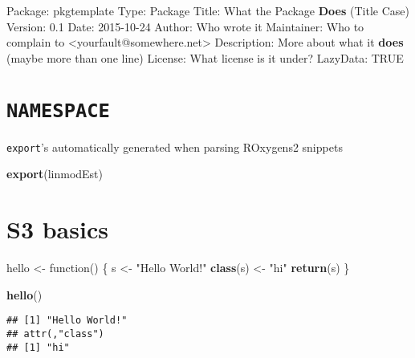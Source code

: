 \documentclass[]{book}
\newenvironment{Shaded}{\begin{snugshade}}{\end{snugshade}}
\newcommand{\KeywordTok}[1]{\textcolor[rgb]{0.13,0.29,0.53}{\textbf{{#1}}}}
\newcommand{\DecValTok}[1]{\textcolor[rgb]{0.00,0.00,0.81}{{#1}}}
\newcommand{\FloatTok}[1]{\textcolor[rgb]{0.00,0.00,0.81}{{#1}}}
\newcommand{\StringTok}[1]{\textcolor[rgb]{0.31,0.60,0.02}{{#1}}}
\newcommand{\OtherTok}[1]{\textcolor[rgb]{0.56,0.35,0.01}{{#1}}}
\newcommand{\NormalTok}[1]{{#1}}
\theoremstyle{definition}
\theoremstyle{definition}
\theoremstyle{definition}
\theoremstyle{remark}
\begin{document}
\begin{Shaded}
\begin{Highlighting}[]
\NormalTok{Package:}\StringTok{ }\NormalTok{pkgtemplate}
\NormalTok{Type:}\StringTok{ }\NormalTok{Package}
\NormalTok{Title:}\StringTok{ }\NormalTok{What the Package }\KeywordTok{Does} \NormalTok{(Title Case)}
\NormalTok{Version:}\StringTok{ }\FloatTok{0.1}
\NormalTok{Date:}\StringTok{ }\DecValTok{2015-10-24}
\NormalTok{Author:}\StringTok{ }\NormalTok{Who wrote it}
\NormalTok{Maintainer:}\StringTok{ }\NormalTok{Who to complain to <yourfault@somewhere.net>}
\NormalTok{Description:}\StringTok{ }\NormalTok{More about what it }\KeywordTok{does} \NormalTok{(maybe more than one line)}
\NormalTok{License:}\StringTok{ }\NormalTok{What license is it under?}
\NormalTok{LazyData:}\StringTok{ }\OtherTok{TRUE}
\end{Highlighting}
\end{Shaded}

\section{\texorpdfstring{\texttt{NAMESPACE}}{NAMESPACE}}\label{namespace}

\texttt{export}'s automatically generated when parsing ROxygens2
snippets

\begin{Shaded}
\begin{Highlighting}[]
\KeywordTok{export}\NormalTok{(linmodEst)}
\end{Highlighting}
\end{Shaded}

\section{S3 basics}\label{s3-basics}

\begin{Shaded}
\begin{Highlighting}[]
\NormalTok{hello <-}\StringTok{ }\NormalTok{function() \{}
 \NormalTok{s <-}\StringTok{ "Hello World!"}
 \KeywordTok{class}\NormalTok{(s) <-}\StringTok{ "hi"}
 \KeywordTok{return}\NormalTok{(s)}
\NormalTok{\}}

\KeywordTok{hello}\NormalTok{()}
\end{Highlighting}
\end{Shaded}

\begin{verbatim}
## [1] "Hello World!"
## attr(,"class")
## [1] "hi"
\end{verbatim}
\end{document}
